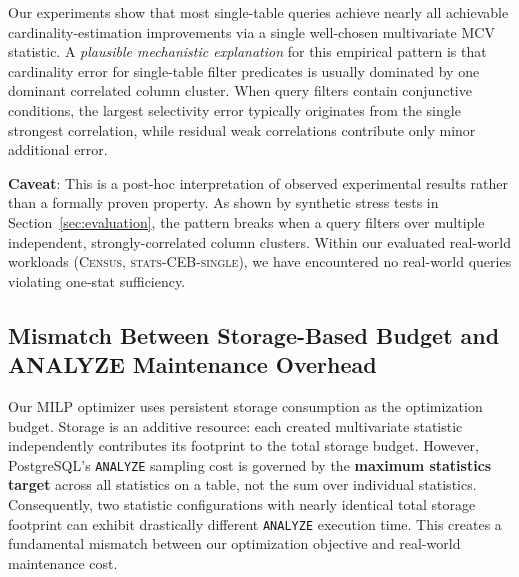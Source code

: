 \documentclass[sigconf, nonacm]{acmart}
\begin{document}
Our experiments show that most single-table queries achieve nearly all achievable cardinality-estimation improvements via a single well-chosen multivariate MCV statistic.
A \textit{plausible mechanistic explanation} for this empirical pattern is that cardinality error for single-table filter predicates is usually dominated by one dominant correlated column cluster.
When query filters contain conjunctive conditions, the largest selectivity error typically originates from the single strongest correlation, while residual weak correlations contribute only minor additional error.

\noindent\textbf{Caveat}: This is a post-hoc interpretation of observed experimental results rather than a formally proven property. As shown by synthetic stress tests in Section~\ref{sec:evaluation}, the pattern breaks when a query filters over multiple independent, strongly-correlated column clusters. Within our evaluated real-world workloads (\textsc{Census}, \textsc{stats-CEB-single}), we have encountered no real-world queries violating one-stat sufficiency.

\subsection{Mismatch Between Storage-Based Budget and ANALYZE Maintenance Overhead}
\label{sec:storage_vs_analyze}
\label{sec:disc-objective}

Our MILP optimizer uses persistent storage consumption as the optimization budget.
Storage is an additive resource: each created multivariate statistic independently contributes its footprint to the total storage budget.
However, PostgreSQL's \texttt{ANALYZE} sampling cost is governed by the \textbf{maximum statistics target} across all statistics on a table, not the sum over individual statistics.
Consequently, two statistic configurations with nearly identical total storage footprint can exhibit drastically different \texttt{ANALYZE} execution time.
This creates a fundamental mismatch between our optimization objective and real-world maintenance cost.
\end{document}
